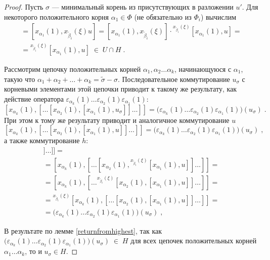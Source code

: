 \documentclass[10pt]{article}
\theoremstyle{break}
\theoremstyle{remark}
\begin{document}
\begin{proof}
Пусть $\sigma$ --- минимальный корень из присутствующих в разложении $u'$. Для некоторого положительного корня $\alpha_1 \in \Phi$ (не обязательно из $\Phi_i$) вычислим
\begin{multline*}
[x_{\alpha_1}(1), h] = [x_{\alpha_1}(1), x_{\widetilde\beta_i}(\xi)u] =
[x_{\alpha_1}(1), x_{\widetilde\beta_i}(\xi)] \cdot {}^{x_{\widetilde\beta_i}(\xi)}[x_{\alpha_1}(1),u] =\\=
{}^{x_{\widetilde\beta_i}(\xi)}[x_{\alpha_1}(1),u] \; \in \; U \cap H \; .
\end{multline*}

Рассмотрим цепочку положительных корней $\alpha_1,\alpha_2 \ldots \alpha_k$, начинающуюся с $\alpha_1$, такую что $\alpha_1+\alpha_2+\ldots+\alpha_k=\widetilde\sigma-\sigma$. Последовательное коммутирование $u_\sigma$ с корневыми элементами этой цепочки приводит к такому же результату, как действие оператора $\varepsilon_{\alpha_k}(1)\ldots\varepsilon_{\alpha_2}(1)\varepsilon_{\alpha_1}(1)$:
$$ [x_{\alpha_k}(1),[\ldots[x_{\alpha_2}(1),[x_{\alpha_1}(1),u_\sigma]]\ldots]] =
\big(\varepsilon_{\alpha_k}(1)\ldots\varepsilon_{\alpha_2}(1)\varepsilon_{\alpha_1}(1)\big)(u_\sigma) \;.$$
При этом к тому же результату приводит и аналогичное коммутирование $u$
$$ [x_{\alpha_k}(1),[\ldots[x_{\alpha_2}(1),[x_{\alpha_1}(1),u]]\ldots]] =
\big(\varepsilon_{\alpha_k}(1)\ldots\varepsilon_{\alpha_2}(1)\varepsilon_{\alpha_1}(1)\big)(u_\sigma) \;,$$
а также коммутирование $h$:
\begin{multline*}
[x_{\alpha_k}(1),[\ldots[x_{\alpha_2}(1),[x_{\alpha_1}(1),h]]\ldots]] =\\=
[x_{\alpha_k}(1),[\ldots[x_{\alpha_2}(1),{}^{x_{\widetilde\beta_i}(\xi)}[x_{\alpha_1}(1),u]]\ldots]] =\\=
[x_{\alpha_k}(1),[\ldots{}^{x_{\widetilde\beta_i}(\xi)}[x_{\alpha_2}(1),[x_{\alpha_1}(1),u]]\ldots]] =\\=
{}^{x_{\widetilde\beta_i}(\xi)}[x_{\alpha_k}(1),[\ldots[x_{\alpha_2}(1),[x_{\alpha_1}(1),u]]\ldots]] =\\=
\big(\varepsilon_{\alpha_k}(1)\ldots\varepsilon_{\alpha_2}(1)\varepsilon_{\alpha_1}(1)\big)(u_\sigma) \;,
\end{multline*}

В результате по лемме \ref{returnfromhighest}, так как $\big(\varepsilon_{\alpha_k}(1)\ldots\varepsilon_{\alpha_2}(1)\varepsilon_{\alpha_1}(1)\big)(u_\sigma) \; \in \; H$ для всех цепочек положительных корней $\alpha_1\ldots\alpha_k$, то и $u_\sigma \in H$.


\end{proof}
\end{document}
